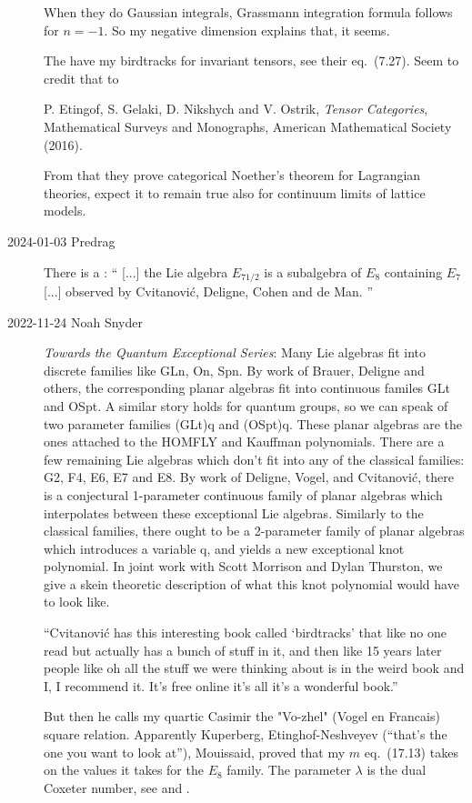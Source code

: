 \begin{description}
When they do Gaussian integrals, Grassmann integration formula follows for
$n=-1$. So my negative dimension explains that, it seems.

The have my birdtracks for invariant tensors, see their eq.~(7.27).
Seem to credit that to

P. Etingof, S. Gelaki, D. Nikshych and V. Ostrik,
{\em Tensor Categories}, Mathematical Surveys
and Monographs, American Mathematical Society (2016).

From that they prove categorical Noether's theorem for Lagrangian theories,
expect it to
remain true also for continuum limits of lattice models.

\item[2024-01-03 Predrag]
There is a
:
``
[...] the Lie algebra $E_{7 1/2}$ is a subalgebra of $E_{8}$ containing
$E_{7}$ [...] observed by Cvitanovi{\'c}, Deligne, Cohen and de Man.
''

\item[2022-11-24 Noah Snyder]
{\em Towards the Quantum Exceptional Series}:
Many Lie algebras fit into discrete families like GLn, On, Spn. By work
of Brauer, Deligne and others, the corresponding planar algebras fit into
continuous familes GLt and OSpt. A similar story holds for quantum groups,
so we can speak of two parameter families (GLt)q and (OSpt)q. These
planar algebras are the ones attached to the HOMFLY and Kauffman
polynomials. There are a few remaining Lie algebras which don't fit into
any of the classical families: G2, F4, E6, E7 and E8. By work of Deligne,
Vogel, and Cvitanovi{\'c}, there is a conjectural 1-parameter  continuous
family of planar algebras which interpolates between these exceptional
Lie algebras. Similarly to the classical families, there ought to be a
2-parameter family of planar algebras which introduces a variable q, and
yields a new exceptional knot polynomial. In joint work with Scott
Morrison and Dylan Thurston, we give a skein theoretic description of
what this knot polynomial would have to look like.

``Cvitanovi{\'c} has this interesting book called `birdtracks'
that like no one read but actually has a bunch of stuff in it, and
then like 15 years later people like oh all the stuff we were thinking about
is in the weird book and  I, I recommend it. It's free online it's all
it's a wonderful book.''

But then he calls my quartic Casimir the "Vo-zhel" (Vogel en Francais) square
relation. Apparently
Kuperberg,
Etinghof-Neshveyev  (``that's the one you want to look at''),
Mouissaid,
proved that my $m$
{eq.~(17.13)}
takes on the values it takes for the $E_8$ family. The parameter $\lambda$
is the dual Coxeter number, see  and
.


\end{description}
